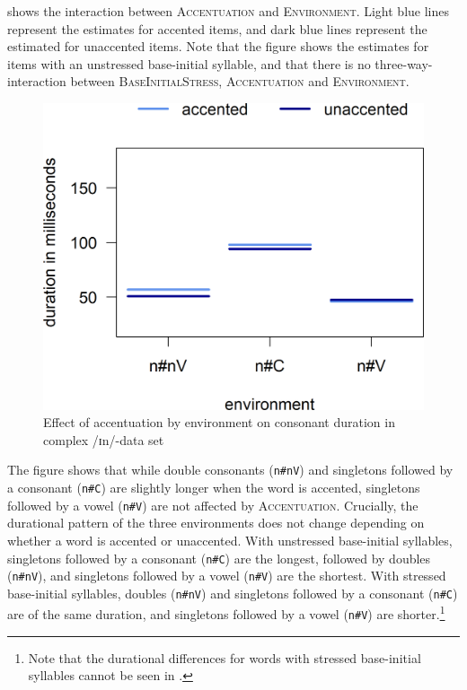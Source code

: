  	
 

 shows the interaction between \textsc{Accentuation} and \textsc{Environment}. Light blue lines represent the estimates for accented items, and dark blue lines represent the estimated for unaccented items. Note that the figure shows the estimates for items with an unstressed base-initial syllable, and that there is no three-way-interaction between \textsc{BaseInitialStress}, \textsc{Accentuation} and \textsc{Environment}. 


	


	\begin{figure} 
		
		\includegraphics [scale=0.5] {images/Experiment/InModelInterEnvAcc}
		\caption{Effect of accentuation by environment on consonant duration in complex /ɪn/-data set}
		\label{fig:Env Acc In experiment} 
	\end{figure}






The figure shows that while double consonants (\texttt{n\#nV}) and singletons followed by a consonant (\texttt{n\#C}) are slightly longer when the word is accented, singletons followed by a vowel (\texttt{n\#V}) are not affected by \textsc{Accentuation}. Crucially, 
the durational pattern of the three environments does not change depending on whether a word is accented or unaccented. 
With unstressed base-initial syllables, singletons followed by a consonant (\texttt{n\#C}) are the longest, followed by doubles (\texttt{n\#nV}), and singletons followed by a vowel (\texttt{n\#V}) are the shortest.
With stressed base-initial syllables, doubles (\texttt{n\#nV}) and singletons followed by a consonant (\texttt{n\#C}) are of the same duration, and singletons followed by a vowel (\texttt{n\#V}) are shorter.\footnote{Note that the durational differences for words with stressed base-initial syllables cannot be seen in .}


